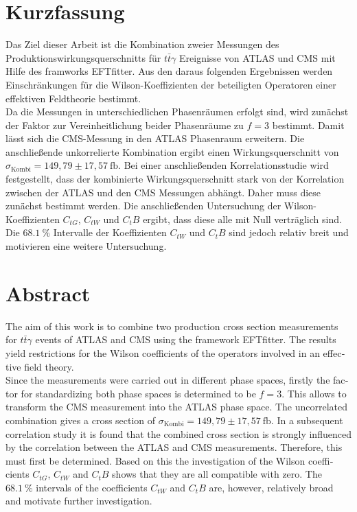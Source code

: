 \thispagestyle{plain}
\section*{Kurzfassung}
Das Ziel dieser Arbeit ist die Kombination zweier Messungen des Produktionswirkungsquerschnitts für $t\bar{t}\gamma$ Ereignisse von ATLAS\cite{Aaboud:2017era} und CMS\cite{Sirunyan:2017iyh} mit Hilfe des framworks EFTfitter\cite{Castro:2016jjv}. Aus den daraus folgenden Ergebnissen werden Einschränkungen für die
Wilson-Koeffizienten der beteiligten Operatoren einer effektiven Feldtheorie bestimmt.\\
Da die Messungen in unterschiedlichen Phasenräumen erfolgt sind, wird zunächst der Faktor zur Vereinheitlichung beider Phasenräume zu $f=3$ bestimmt. Damit lässt sich die CMS-Messung in den ATLAS Phasenraum erweitern. Die anschließende unkorrelierte Kombination ergibt einen Wirkungsquerschnitt von $\sigma_{\text{Kombi}} = 149,79 \pm 17,57~ \si{\femto\barn}$. Bei einer anschließenden Korrelationsstudie wird festgestellt, dass der kombinierte Wirkungsquerschnitt stark von der Korrelation zwischen der ATLAS und den CMS Messungen abhängt. Daher muss diese zunächst bestimmt werden. Die anschließenden Untersuchung der Wilson-Koeffizienten $C_{tG}$, $C_{tW}$ und $C_tB$ ergibt, dass diese alle mit Null verträglich sind. Die $\SI{68.1}{\percent}$ Intervalle der Koeffizienten $C_{tW}$ und $C_tB$ sind jedoch relativ breit und motivieren eine weitere Untersuchung.
\section*{Abstract}
\begin{english}
  The aim of this work is to combine two production cross section measurements for $t\bar{t}\gamma$ events of ATLAS\cite{Aaboud:2017era} and CMS\cite{Sirunyan:2017iyh} using the framework EFTfitter\cite{Castro:2016jjv}. The results yield restrictions for the
  Wilson coefficients of the operators involved in an effective field theory.\\
  Since the measurements were carried out in different phase spaces, firstly the factor for standardizing both phase spaces is determined to be $f=3$. This allows to transform the CMS measurement into the ATLAS phase space. The uncorrelated combination gives a cross section of $\sigma_{\text{Kombi}} = 149,79 \pm 17,57~ \si{\femto\barn}$. In a subsequent correlation study it is found that the combined cross section is strongly influenced by the correlation between the ATLAS and CMS measurements. Therefore, this must first be determined. Based on this the investigation of the Wilson coefficients $C_{tG}$, $C_{tW}$ and $C_tB$ shows that they are all compatible with zero. The $\SI{68.1}{\percent}$  intervals of the coefficients $C_{tW}$ and $C_tB$ are, however, relatively broad and motivate further investigation.
\end{english}
